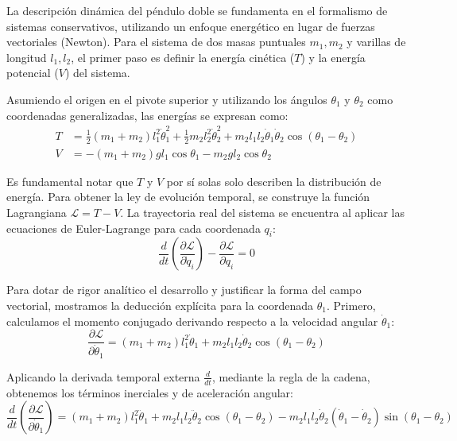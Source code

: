\documentclass[13pt]{extarticle}
\begin{document}
La descripción dinámica del péndulo doble se fundamenta en el formalismo de sistemas conservativos, utilizando un enfoque energético en lugar de fuerzas vectoriales (Newton). Para el sistema de dos masas puntuales $m_1, m_2$ y varillas de longitud $l_1, l_2$, el primer paso es definir la energía cinética ($T$) y la energía potencial ($V$) del sistema.

Asumiendo el origen en el pivote superior y utilizando los ángulos $\theta_1$ y $\theta_2$ como coordenadas generalizadas, las energías se expresan como:
\begin{align}
    T &= \frac{1}{2}(m_1+m_2) l_1^2 \dot{\theta}_1^2 + \frac{1}{2}m_2 l_2^2 \dot{\theta}_2^2 + m_2 l_1 l_2 \dot{\theta}_1 \dot{\theta}_2 \cos(\theta_1 - \theta_2) \\
    V &= -(m_1 + m_2) g l_1 \cos\theta_1 - m_2 g l_2 \cos\theta_2
\end{align}

Es fundamental notar que $T$ y $V$ por sí solas solo describen la distribución de energía. Para obtener la ley de evolución temporal, se construye la función Lagrangiana $\mathcal{L} = T - V$. La trayectoria real del sistema se encuentra al aplicar las ecuaciones de Euler-Lagrange para cada coordenada $q_i$:
\begin{equation}
    \frac{d}{dt} \left( \frac{\partial \mathcal{L}}{\partial \dot{q}_i} \right) - \frac{\partial \mathcal{L}}{\partial q_i} = 0
\end{equation}

Para dotar de rigor analítico el desarrollo y justificar la forma del campo vectorial, mostramos la deducción explícita para la coordenada $\theta_1$. Primero, calculamos el momento conjugado derivando respecto a la velocidad angular $\dot{\theta}_1$:
\begin{equation}
    \frac{\partial \mathcal{L}}{\partial \dot{\theta}_1} = (m_1+m_2) l_1^2 \dot{\theta}_1 + m_2 l_1 l_2 \dot{\theta}_2 \cos(\theta_1 - \theta_2)
\end{equation}

Aplicando la derivada temporal externa $\frac{d}{dt}$, mediante la regla de la cadena, obtenemos los términos inerciales y de aceleración angular:
\begin{equation}
    \frac{d}{dt}\left(\frac{\partial \mathcal{L}}{\partial \dot{\theta}_1}\right) = (m_1+m_2) l_1^2 \ddot{\theta}_1 + m_2 l_1 l_2 \ddot{\theta}_2 \cos(\theta_1 - \theta_2) - m_2 l_1 l_2 \dot{\theta}_2 (\dot{\theta}_1 - \dot{\theta}_2) \sin(\theta_1 - \theta_2)
\end{equation}
\end{document}
